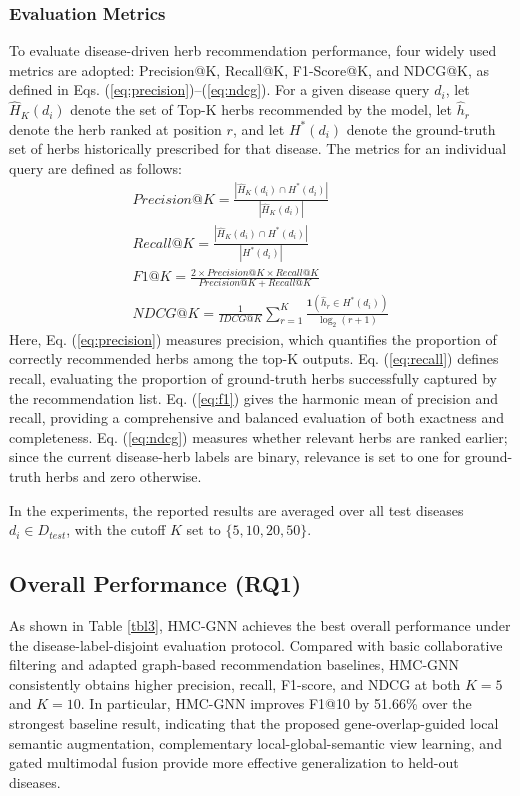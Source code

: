 \documentclass[a4paper,fleqn]{cas-dc}
\begin{document}
\subsubsection{Evaluation Metrics}
To evaluate disease-driven herb recommendation performance, four widely used metrics are adopted: Precision@K, Recall@K, F1-Score@K, and NDCG@K, as defined in Eqs. (\ref{eq:precision})--(\ref{eq:ndcg}). For a given disease query $d_i$, let $\hat{H}_K(d_i)$ denote the set of Top-K herbs recommended by the model, let $\hat{h}_r$ denote the herb ranked at position $r$, and let $H^*(d_i)$ denote the ground-truth set of herbs historically prescribed for that disease. The metrics for an individual query are defined as follows:
\begin{gather}
\label{eq:precision}
\mathit{Precision}@K = \frac{|\hat{H}_K(d_i) \cap H^*(d_i)|}{|\hat{H}_K(d_i)|} \\
\label{eq:recall}
\mathit{Recall}@K = \frac{|\hat{H}_K(d_i) \cap H^*(d_i)|}{|H^*(d_i)|} \\
\label{eq:f1}
\mathit{F1}@K = \frac{2 \times \mathit{Precision}@K \times \mathit{Recall}@K}{\mathit{Precision}@K + \mathit{Recall}@K} \\
\label{eq:ndcg}
\mathit{NDCG}@K = \frac{1}{\mathit{IDCG}@K} \sum_{r=1}^{K} \frac{\mathbf{1}(\hat{h}_r \in H^*(d_i))}{\log_2(r+1)}
\end{gather}
Here, Eq. (\ref{eq:precision}) measures precision, which quantifies the proportion of correctly recommended herbs among the top-K outputs. Eq. (\ref{eq:recall}) defines recall, evaluating the proportion of ground-truth herbs successfully captured by the recommendation list. Eq. (\ref{eq:f1}) gives the harmonic mean of precision and recall, providing a comprehensive and balanced evaluation of both exactness and completeness. Eq. (\ref{eq:ndcg}) measures whether relevant herbs are ranked earlier; since the current disease-herb labels are binary, relevance is set to one for ground-truth herbs and zero otherwise.

In the experiments, the reported results are averaged over all test diseases $d_i \in D_{test}$, with the cutoff $K$ set to $\{5, 10, 20, 50\}$.

\subsection{Overall Performance (RQ1)}

As shown in Table \ref{tbl3}, HMC-GNN achieves the best overall performance under the disease-label-disjoint evaluation protocol. Compared with basic collaborative filtering and adapted graph-based recommendation baselines, HMC-GNN consistently obtains higher precision, recall, F1-score, and NDCG at both $K=5$ and $K=10$. In particular, HMC-GNN improves F1@10 by 51.66\% over the strongest baseline result, indicating that the proposed gene-overlap-guided local semantic augmentation, complementary local-global-semantic view learning, and gated multimodal fusion provide more effective generalization to held-out diseases.
\end{document}
